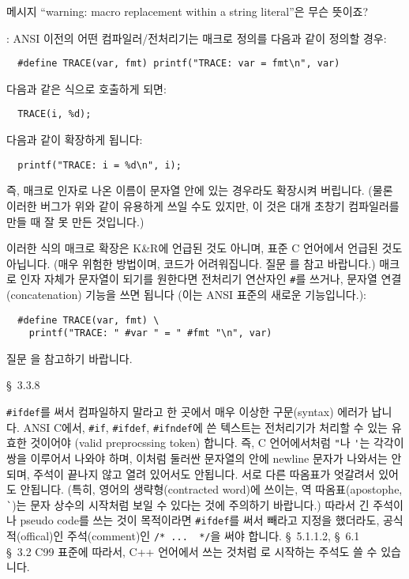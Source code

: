 \begin{faq}
	메시지 ``warning: macro replacement within a string literal''은
	무슨 뜻이죠?

\A:
	ANSI 이전의 어떤 컴파일러/전처리기는 매크로 정의를 다음과 같이
	정의할 경우:

\begin{verbatim}
  #define TRACE(var, fmt) printf("TRACE: var = fmt\n", var)
\end{verbatim}

	\noindent 다음과 같은 식으로 호출하게 되면:

\begin{verbatim}
  TRACE(i, %d);
\end{verbatim}

	\noindent 다음과 같이 확장하게 됩니다:
\begin{verbatim}
  printf("TRACE: i = %d\n", i);
\end{verbatim}

	즉, 매크로 인자로 나온 이름이 문자열 안에 있는 경우라도
	확장시켜 버립니다. (물론 이러한 버그가 위와 같이 유용하게 쓰일 수도
        있지만, 이 것은 대개 초창기 컴파일러를 만들 때 잘 못 만든 것입니다.)


	이러한 식의 매크로 확장은 K\&R에 언급된 것도 아니며, 표준 C 언어에서
	언급된 것도 아닙니다. (매우 위험한 방법이며, 코드가 어려워집니다.
        질문 를 참고 바랍니다.) 
        매크로 인자 자체가 문자열이 되기를 원한다면
	전처리기 연산자인 \verb+#+를 쓰거나, 문자열 연결 (concatenation) 기능을
	쓰면 됩니다 (이는 ANSI 표준의 새로운 기능입니다.):

\begin{verbatim}
  #define TRACE(var, fmt) \
    printf("TRACE: " #var " = " #fmt "\n", var)
\end{verbatim}
	질문 을 참고하기 바랍니다.

\R
	\cite{hs} \S\ 3.3.8 
\end{faq}

\begin{faq}
	\verb+#ifdef+를 써서 컴파일하지 말라고 한 곳에서 매우 이상한
	구문(syntax) 에러가 납니다.
\A
	ANSI C에서, \verb+#if+, \verb+#ifdef+, \verb+#ifndef+에 쓴 텍스트는
	전처리기가 처리할 수 있는 유효한 것이어야 (valid preprocssing
	token) 합니다. 
	즉, C 언어에서처럼 \verb+"+나 \verb+'+는 각각이 쌍을 이루어서
	나와야 하며, 이처럼 둘러싼 문자열의 안에 newline 문자가 나와서는
        안되며, 주석이 끝나지 않고 열려 있어서도 안됩니다.
	서로 다른 따옴표가 엇갈려서 있어도 안됩니다.
	(특히, 영어의 생략형(contracted word)에
	쓰이는,  역 따옴표(apostophe, \verb+`+)는
	문자 상수의 시작처럼 보일 수 있다는 것에 주의하기 바랍니다.)
	따라서 긴 주석이나 pseudo code를 쓰는 것이 목적이라면
	\verb+#ifdef+를 써서 빼라고 지정을 했더라도, 공식적(offical)인
	주석(comment)인 \verb+/* ...  */+을 써야 합니다.
\R
	\cite{c89} \S\ 5.1.1.2, \S\ 6.1 \\
	\cite{hs} \S\ 3.2 
\T
	C99 표준에 따라서, C++ 언어에서 쓰는 것처럼 \TT{//}로 시작하는 
        주석도 쓸 수 있습니다.
\end{faq}

